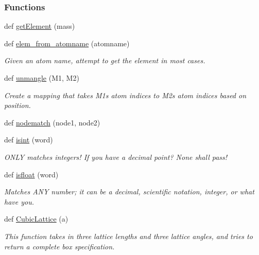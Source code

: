 \subsubsection*{Functions}
\begin{DoxyCompactItemize}
\item 
def \hyperlink{namespacesrc_1_1molecule_ae26e509ce54bf76724a18ba91107df72}{get\+Element} (mass)
\item 
def \hyperlink{namespacesrc_1_1molecule_a4638e3bec89d2fa20ba340988456a1ac}{elem\+\_\+from\+\_\+atomname} (atomname)
\begin{DoxyCompactList}\small\item\em Given an atom name, attempt to get the element in most cases. \end{DoxyCompactList}\item 
def \hyperlink{namespacesrc_1_1molecule_a784faffc34b87c6f72db0f4915e1a355}{unmangle} (M1, M2)
\begin{DoxyCompactList}\small\item\em Create a mapping that takes M1\textquotesingle{}s atom indices to M2\textquotesingle{}s atom indices based on position. \end{DoxyCompactList}\item 
def \hyperlink{namespacesrc_1_1molecule_a5928a44288a03b8c3ff61204feaa054b}{nodematch} (node1, node2)
\item 
def \hyperlink{namespacesrc_1_1molecule_a651f6c6d23932f5a2151784c992e94a8}{isint} (word)
\begin{DoxyCompactList}\small\item\em O\+N\+LY matches integers! If you have a decimal point? None shall pass! \end{DoxyCompactList}\item 
def \hyperlink{namespacesrc_1_1molecule_ac2056d27322c6ee6dff0bef3755f2ed3}{isfloat} (word)
\begin{DoxyCompactList}\small\item\em Matches A\+NY number; it can be a decimal, scientific notation, integer, or what have you. \end{DoxyCompactList}\item 
def \hyperlink{namespacesrc_1_1molecule_a940e04377db02e5114741a4bf8a6f084}{Cubic\+Lattice} (a)
\begin{DoxyCompactList}\small\item\em This function takes in three lattice lengths and three lattice angles, and tries to return a complete box specification. \end{DoxyCompactList}\item 

\end{DoxyCompactItemize}

